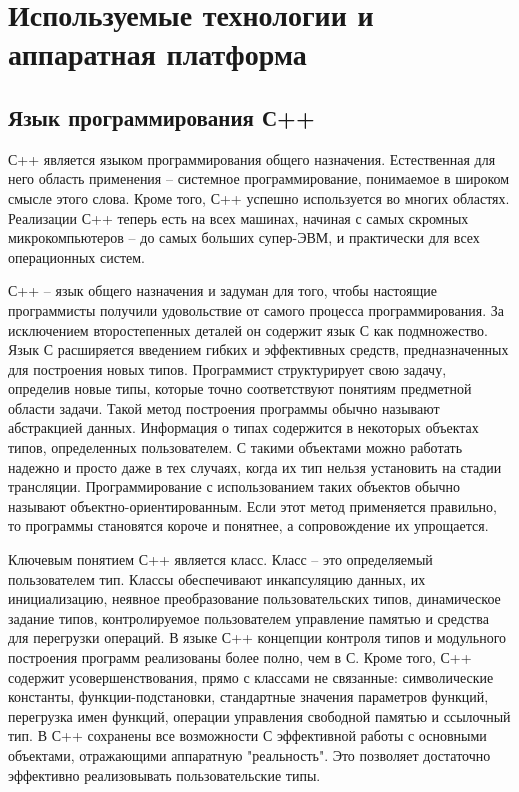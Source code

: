 \section{Используемые технологии и аппаратная платформа}


\subsection{Язык программирования С++}

С++ является языком программирования общего назначения. Естественная для него область
применения -- системное программирование, понимаемое в широком смысле этого слова. Кроме того, С++ успешно используется во многих областях. Реализации С++ теперь есть на всех машинах, начиная с самых скромных микрокомпьютеров -- до самых больших супер-ЭВМ, и практически для всех операционных систем.

С++ -- язык общего назначения и задуман для того, чтобы настоящие программисты получили
удовольствие от самого процесса программирования. За исключением второстепенных деталей он содержит язык С как подмножество. Язык С расширяется введением гибких и эффективных средств, предназначенных для построения новых типов. Программист структурирует свою задачу, определив новые типы, которые точно соответствуют понятиям предметной области задачи. Такой метод построения программы обычно называют абстракцией данных. Информация о типах содержится в некоторых объектах типов, определенных пользователем. С такими объектами можно работать надежно и просто даже в тех случаях, когда их тип нельзя установить на стадии трансляции. Программирование с использованием таких объектов обычно называют объектно-ориентированным. Если этот метод применяется правильно, то программы становятся короче и понятнее, а сопровождение их упрощается.

Ключевым понятием С++ является класс. Класс -- это определяемый пользователем тип. Классы обеспечивают инкапсуляцию данных, их инициализацию, неявное преобразование пользовательских типов, динамическое задание типов, контролируемое пользователем управление памятью и средства для перегрузки операций. В языке С++ концепции контроля типов и модульного построения программ реализованы более полно, чем в С. Кроме того, С++ содержит усовершенствования, прямо с классами не связанные: символические константы, функции-подстановки, стандартные значения параметров
функций, перегрузка имен функций, операции управления свободной памятью и ссылочный тип. В С++ сохранены все возможности С эффективной работы с основными объектами, отражающими аппаратную "реальность". Это позволяет достаточно эффективно реализовывать пользовательские типы.

